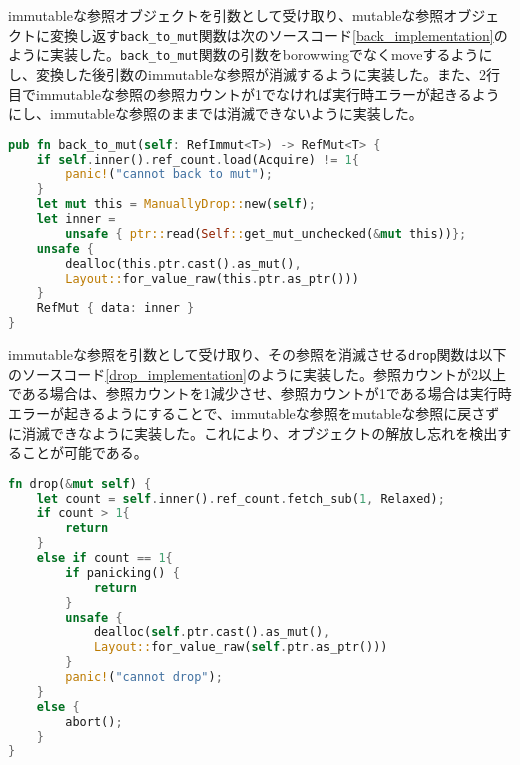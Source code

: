 \documentclass{sumiilab-paper}
\theoremstyle{mystyle}
\numberwithin{definition}{chapter} %
\begin{document}
immutableな参照オブジェクトを引数として受け取り、mutableな参照オブジェクトに変換し返す\texttt{back\_to\_mut}関数は次のソースコード\ref{back_implementation}のように実装した。\texttt{back\_to\_mut}関数の引数をborowwingでなくmoveするようにし、変換した後引数のimmutableな参照が消滅するように実装した。また、2行目でimmutableな参照の参照カウントが1でなければ実行時エラーが起きるようにし、immutableな参照のままでは消滅できないように実装した。
\begin{lstlisting}[language=Rust, caption=関数back\_to\_mutの実装, label=back_implementation, captionpos=b]
pub fn back_to_mut(self: RefImmut<T>) -> RefMut<T> {
    if self.inner().ref_count.load(Acquire) != 1{
        panic!("cannot back to mut");
    }
    let mut this = ManuallyDrop::new(self);
    let inner =
        unsafe { ptr::read(Self::get_mut_unchecked(&mut this))};
    unsafe {
        dealloc(this.ptr.cast().as_mut(), 
        Layout::for_value_raw(this.ptr.as_ptr()))
    }
    RefMut { data: inner }
}
\end{lstlisting}

immutableな参照を引数として受け取り、その参照を消滅させる\texttt{drop}関数は以下のソースコード\ref{drop_implementation}のように実装した。参照カウントが2以上である場合は、参照カウントを1減少させ、参照カウントが1である場合は実行時エラーが起きるようにすることで、immutableな参照をmutableな参照に戻さずに消滅できなように実装した。これにより、オブジェクトの解放し忘れを検出することが可能である。
\begin{lstlisting}[language=Rust, caption=関数back\_to\_mutの実装, label=drop_implementation, captionpos=b]
fn drop(&mut self) {
    let count = self.inner().ref_count.fetch_sub(1, Relaxed);
    if count > 1{
        return
    }
    else if count == 1{
        if panicking() {
            return
        }
        unsafe {
            dealloc(self.ptr.cast().as_mut(), 
            Layout::for_value_raw(self.ptr.as_ptr()))
        }
        panic!("cannot drop");
    }
    else {
        abort();
    }
}
\end{lstlisting}
\end{document}
